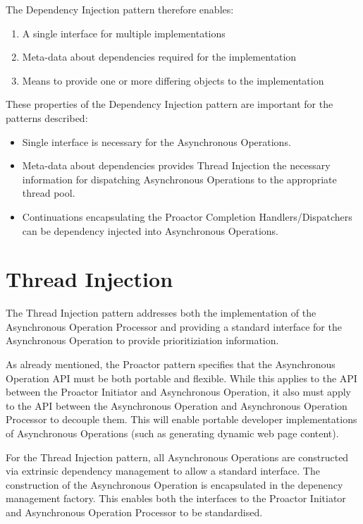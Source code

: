 \documentclass{article}
\begin{document}
The Dependency Injection pattern therefore enables:
\begin{enumerate}
  \item A single interface for multiple implementations
  \item Meta-data about dependencies required for the implementation
  \item Means to provide one or more differing objects to the implementation
\end{enumerate}

These properties of the Dependency Injection pattern are important for the
patterns described:
\begin{itemize}
  \item Single interface is necessary for the Asynchronous Operations.
  \item Meta-data about dependencies provides Thread Injection the necessary information for dispatching Asynchronous Operations to the appropriate thread pool.
  \item Continuations encapsulating the Proactor Completion Handlers/Dispatchers can be dependency injected into Asynchronous Operations.
\end{itemize}


\section{Thread Injection}

The Thread Injection pattern addresses both the implementation of the
Asynchronous Operation Processor and providing a standard interface for the
Asynchronous Operation to provide prioritiziation information.

As already mentioned, the Proactor pattern specifies that the Asynchronous
Operation API must be both portable and flexible.  While this applies to the API
between the Proactor Initiator and Asynchronous Operation, it also must apply to
the API between the Asynchronous Operation and Asynchronous Operation Processor
to decouple them.  This will enable portable developer implementations of
Asynchronous Operations (such as generating dynamic web page content). 

For the Thread Injection pattern, all Asynchronous Operations are constructed
via extrinsic dependency management \cite{ioc} to allow a standard interface.
The construction of the Asynchronous Operation is encapsulated in the depenency
management factory.  This enables both the interfaces to the Proactor Initiator
and Asynchronous Operation Processor to be standardised.
\end{document}

